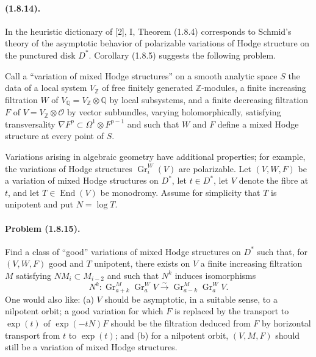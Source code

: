 \documentclass[11pt]{article}
\theoremstyle{remark}
\newcommand{\Gr}{\operatorname{Gr}}
\newcommand{\End}{\operatorname{End}}
\begin{document}
\paragraph{(1.8.14).} In the heuristic dictionary of [2], I, Theorem (1.8.4) corresponds to Schmid's theory of the asymptotic behavior of polarizable variations of Hodge structure on the punctured disk $D^*$. Corollary (1.8.5) suggests the following problem.

Call a ``variation of mixed Hodge structures'' on a smooth analytic space $S$ the data of a local system $V_\mathbb Z$ of free finitely generated $\mathbb Z$-modules, a finite increasing filtration $W$ of $V_\mathbb Q=V_\mathbb Z\otimes\mathbb Q$ by local subsystems, and a finite decreasing filtration $F$ of $V=V_\mathbb Z\otimes\mathcal O$ by vector subbundles, varying holomorphically, satisfying transversality $\nabla F^p\subset\Omega^1\otimes F^{p-1}$ and such that $W$ and $F$ define a mixed Hodge structure at every point of $S$.

Variations arising in algebraic geometry have additional properties; for example, the variations of Hodge structures $\Gr^W_i(V)$ are polarizable. Let $(V,W,F)$ be a variation of mixed Hodge structures on $D^*$, let $t\in D^*$, let $V$ denote the fibre at $t$, and let $T\in\End(V)$ be monodromy. Assume for simplicity that $T$ is unipotent and put $N=\log T$.

\paragraph{Problem (1.8.15).} Find a class of ``good'' variations of mixed Hodge structures on $D^*$ such that, for $(V,W,F)$ good and $T$ unipotent, there exists on $V$ a finite increasing filtration $M$ satisfying $NM_i\subset M_{i-2}$ and such that $N^k$ induces isomorphisms
\[
        N^k: \Gr^M_{a+k}\Gr^W_aV\xrightarrow{\sim}\Gr^M_{a-k}\Gr^W_aV.
\]
One would also like: (a) $V$ should be asymptotic, in a suitable sense, to a nilpotent orbit; a good variation for which $F$ is replaced by the transport to $\exp(t)$ of $\exp(-tN)F$ should be the filtration deduced from $F$ by horizontal transport from $t$ to $\exp(t)$; and (b) for a nilpotent orbit, $(V,M,F)$ should still be a variation of mixed Hodge structures.
\end{document}
